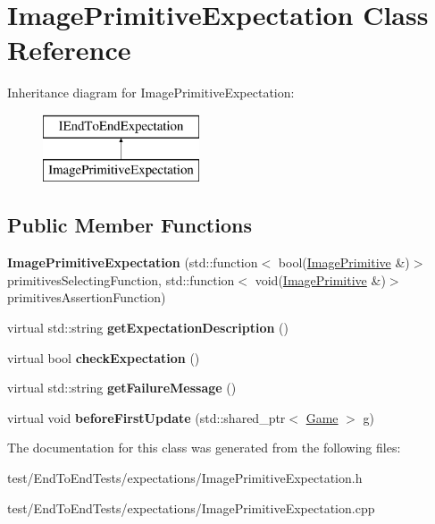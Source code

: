 \hypertarget{classImagePrimitiveExpectation}{}\section{Image\+Primitive\+Expectation Class Reference}
\label{classImagePrimitiveExpectation}
Inheritance diagram for Image\+Primitive\+Expectation\+:\begin{figure}[H]
\begin{center}
\leavevmode
\includegraphics[height=2.000000cm]{classImagePrimitiveExpectation}
\end{center}
\end{figure}
\subsection*{Public Member Functions}
\begin{DoxyCompactItemize}
\item 
{\bfseries Image\+Primitive\+Expectation} (std\+::function$<$ bool(\hyperlink{classImagePrimitive}{Image\+Primitive} \&)$>$ primitives\+Selecting\+Function, std\+::function$<$ void(\hyperlink{classImagePrimitive}{Image\+Primitive} \&)$>$ primitives\+Assertion\+Function)\hypertarget{classImagePrimitiveExpectation_aef3b5e728dc3bba87240c6973d3ba364}{}\label{classImagePrimitiveExpectation_aef3b5e728dc3bba87240c6973d3ba364}

\item 
virtual std\+::string {\bfseries get\+Expectation\+Description} ()\hypertarget{classImagePrimitiveExpectation_ae57ed7b9198d2b1e8f203e853decf1c9}{}\label{classImagePrimitiveExpectation_ae57ed7b9198d2b1e8f203e853decf1c9}

\item 
virtual bool {\bfseries check\+Expectation} ()\hypertarget{classImagePrimitiveExpectation_a6a6c79f8cef08b81b61632e20e2ffc0e}{}\label{classImagePrimitiveExpectation_a6a6c79f8cef08b81b61632e20e2ffc0e}

\item 
virtual std\+::string {\bfseries get\+Failure\+Message} ()\hypertarget{classImagePrimitiveExpectation_a523380f8b393b8e2e8054c1c746b46f8}{}\label{classImagePrimitiveExpectation_a523380f8b393b8e2e8054c1c746b46f8}

\item 
virtual void {\bfseries before\+First\+Update} (std\+::shared\+\_\+ptr$<$ \hyperlink{classGame}{Game} $>$ g)\hypertarget{classImagePrimitiveExpectation_a84bde7866ee1c0f086db3511ebe752b3}{}\label{classImagePrimitiveExpectation_a84bde7866ee1c0f086db3511ebe752b3}

\end{DoxyCompactItemize}


The documentation for this class was generated from the following files\+:\begin{DoxyCompactItemize}
\item 
test/\+End\+To\+End\+Tests/expectations/Image\+Primitive\+Expectation.\+h\item 
test/\+End\+To\+End\+Tests/expectations/Image\+Primitive\+Expectation.\+cpp\end{DoxyCompactItemize}
